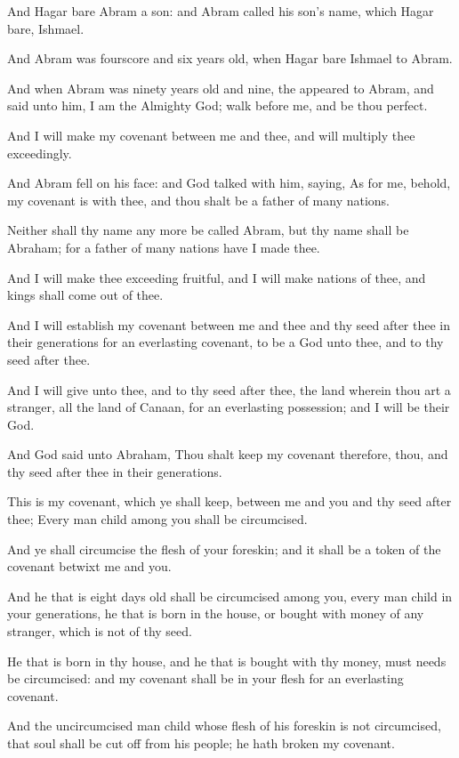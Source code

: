 \Verse And Hagar bare Abram a son: and Abram called his son's name, which Hagar bare, Ishmael.

\Verse And Abram was fourscore and six years old, when Hagar bare Ishmael to Abram.

\Chapter
\Verse And when Abram was ninety years old and nine, the \LORD appeared to Abram, and said unto him, I am the Almighty God; walk before me, and be thou perfect.

\Verse And I will make my covenant between me and thee, and will multiply thee exceedingly.

\Verse And Abram fell on his face: and God talked with him, saying, \Verse As for me, behold, my covenant is with thee, and thou shalt be a father of many nations.

\Verse Neither shall thy name any more be called Abram, but thy name shall be Abraham; for a father of many nations have I made thee.

\Verse And I will make thee exceeding fruitful, and I will make nations of thee, and kings shall come out of thee.

\Verse And I will establish my covenant between me and thee and thy seed after thee in their generations for an everlasting covenant, to be a God unto thee, and to thy seed after thee.

\Verse And I will give unto thee, and to thy seed after thee, the land wherein thou art a stranger, all the land of Canaan, for an everlasting possession; and I will be their God.

\Verse And God said unto Abraham, Thou shalt keep my covenant therefore, thou, and thy seed after thee in their generations.

\Verse This is my covenant, which ye shall keep, between me and you and thy seed after thee; Every man child among you shall be circumcised.

\Verse And ye shall circumcise the flesh of your foreskin; and it shall be a token of the covenant betwixt me and you.

\Verse And he that is eight days old shall be circumcised among you, every man child in your generations, he that is born in the house, or bought with money of any stranger, which is not of thy seed.

\Verse He that is born in thy house, and he that is bought with thy money, must needs be circumcised: and my covenant shall be in your flesh for an everlasting covenant.

\Verse And the uncircumcised man child whose flesh of his foreskin is not circumcised, that soul shall be cut off from his people; he hath broken my covenant.

